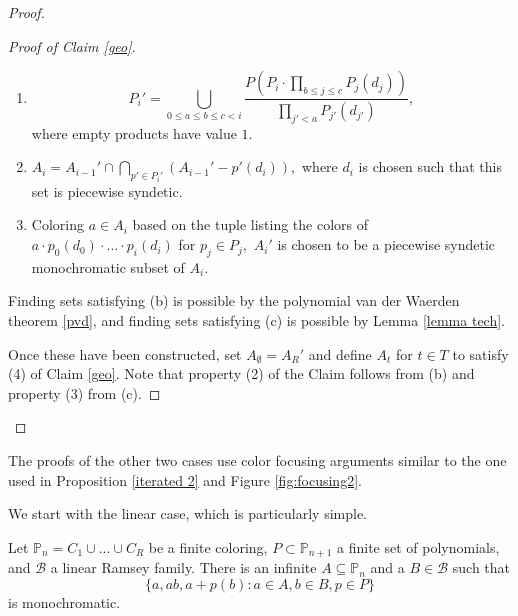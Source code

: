 \documentclass[tocmacros]{daj}
\begin{document}
\begin{proof}
\begin{proof}[Proof of Claim \ref{geo}]
\begin{enumerate}
    \item[(a)] $$P_i'= \bigcup_{0\leq a\leq b\leq c<i} \frac{P(P_i\cdot\prod_{b\leq j\leq c} P_j(d_j))}{\prod_{ j' <a}P_{j'}(d_{j'})},$$ where empty products have value $1.$
    \item[(b)] $A_i=A_{i-1}'\cap\bigcap_{p'\in P_i'} (A_{i-1}'-p'(d_i)),$ where $d_i$ is chosen such that this set is piecewise syndetic.
    \item[(c)] Coloring $a\in A_i$ based on the tuple listing the colors of $a\cdot p_0(d_0)\cdot...\cdot p_i(d_i)$ for $p_j\in P_j,$ $A_i'$ is chosen to be a piecewise syndetic monochromatic subset of $A_i.$ 
\end{enumerate}

Finding sets satisfying (b) is possible by the polynomial van der Waerden theorem \ref{pvd}, and finding sets satisfying (c) is possible by Lemma \ref{lemma tech}.

Once these have been constructed, set $A_\emptyset=A_{R}'$ and define $A_t$ for $t\in T$ to satisfy (4) of Claim \ref{geo}.  Note that property (2) of the Claim follows from (b) and property (3) from (c).

\end{proof}

\end{proof}

The proofs of the other two cases use color focusing arguments similar to the one used in Proposition \ref{iterated 2} and Figure \ref{fig:focusing2}.

We start with the linear case, which is particularly simple.

\begin{proposition}\label{linear proof}
Let $\mathbb{P}_n=C_1\cup...\cup C_R$ be a finite coloring, $P\subset \mathbb{P}_{n+1}$ a finite set of polynomials, and $\mathcal{B}$ a linear Ramsey family.  There is an infinite $A\subseteq \mathbb{P}_n$ and a $B\in\mathcal{B}$ such that $$\{a,ab,a+p(b): a\in A, b\in B, p\in P\}$$ is monochromatic.  
\end{proposition}
\end{document}
